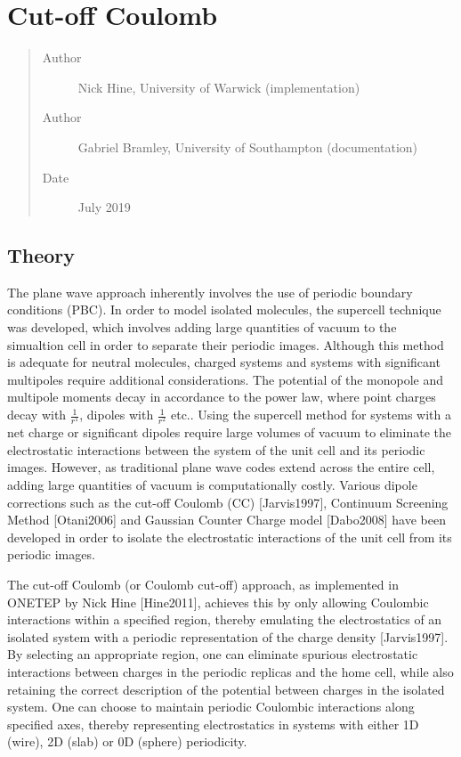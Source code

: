 \documentclass[letterpaper,10pt,english]{sphinxmanual}
\begin{document}
\section{Cut-off Coulomb}
\label{\detokenize{cutoff_coulomb::doc}}\label{\detokenize{cutoff_coulomb:cut-off-coulomb}}\begin{quote}\begin{description}
\item[{Author}] \leavevmode
Nick Hine, University of Warwick (implementation)

\item[{Author}] \leavevmode
Gabriel Bramley, University of Southampton (documentation)

\item[{Date}] \leavevmode
July 2019

\end{description}\end{quote}


\subsection{Theory}
\label{\detokenize{cutoff_coulomb:theory}}
The plane wave approach inherently involves the use of periodic boundary
conditions (PBC). In order to model isolated molecules, the supercell
technique was developed, which involves adding large quantities of
vacuum to the simualtion cell in order to separate their periodic
images. Although this method is adequate for neutral molecules, charged
systems and systems with significant multipoles require additional
considerations. The potential of the monopole and multipole moments
decay in accordance to the power law, where point charges decay with
\(\frac{1}{r^{1}}\), dipoles with \(\frac{1}{r^{2}}\) etc..
Using the supercell method for systems with a net charge or significant
dipoles require large volumes of vacuum to eliminate the electrostatic
interactions between the system of the unit cell and its periodic
images. However, as traditional plane wave codes extend across the
entire cell, adding large quantities of vacuum is computationally
costly. Various dipole corrections such as the cut-off Coulomb (CC)
{[}Jarvis1997{]}, Continuum Screening Method
{[}Otani2006{]} and Gaussian
Counter Charge model
{[}Dabo2008{]} have been
developed in order to isolate the electrostatic interactions of the unit
cell from its periodic images.

The cut-off Coulomb (or Coulomb cut-off) approach, as implemented in
ONETEP by Nick Hine {[}Hine2011{]}, achieves this by only
allowing Coulombic interactions within a specified region, thereby
emulating the electrostatics of an isolated system with a periodic
representation of the charge density {[}Jarvis1997{]}. By
selecting an appropriate region, one can eliminate spurious
electrostatic interactions between charges in the periodic replicas and
the home cell, while also retaining the correct description of the
potential between charges in the isolated system. One can choose to
maintain periodic Coulombic interactions along specified axes, thereby
representing electrostatics in systems with either 1D (wire), 2D (slab)
or 0D (sphere) periodicity.
\end{document}
